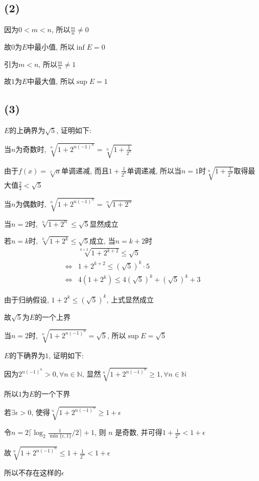 \documentclass[a4paper,11pt]{article}
\begin{document}
\subsection*{(2)}
因为$0<m<n$, 所以$\frac{m}{n} \not = 0$

故$0$为$E$中最小值, 所以$\inf E = 0$

引为$m<n$, 所以$\frac{m}{n} \not = 1$

故$1$为$E$中最大值, 所以$\sup E = 1$
\subsection*{(3)}
$E$的上确界为$\sqrt 5$, 证明如下:

当$n$为奇数时, $\sqrt[n]{1+2^{n(-1)^n}} = \sqrt[n]{1+\frac{1}{2^n}}$

由于$f(x)=\sqrt[x]{a}$单调递减, 而且$1+\frac{1}{2^n}$单调递减, 所以当$n=1$时$\sqrt[n]{1+\frac{1}{2^n}}$取得最大值$\frac{2}{3} < \sqrt{5}$

当$n$为偶数时, $\sqrt[n]{1+2^{n(-1)^n}} = \sqrt[n]{1+2^n}$

当$n=2$时, $\sqrt[n]{1+2^n} \le \sqrt{5}$显然成立

若$n=k$时, $\sqrt[k]{1+2^k} \le \sqrt{5}$成立, 当$n=k+2$时
\begin{align*}
	&\sqrt[k+2]{1+2^{k+2}} \le \sqrt{5}\\
	\Leftrightarrow&1+2^{k+2} \le (\sqrt{5})^k\cdot 5\\
	\Leftrightarrow&4(1+2^k) \le 4(\sqrt{5})^k + (\sqrt{5})^k + 3
\end{align*}

由于归纳假设, $1+2^k\le(\sqrt{5})^k$, 上式显然成立

故$\sqrt{5}$为$E$的一个上界

当$n=2$时, $\sqrt[n]{1+2^{n(-1)^n}} = \sqrt{5}$, 所以$\sup E=\sqrt{5}$

$E$的下确界为$1$, 证明如下:

因为$2^{n(-1)^n}>0, \forall n \in \mathbb{N}$, 显然$\sqrt[n]{1+2^{n(-1)^n}} \ge 1, \forall n \in \mathbb{N}$

所以$1$为$E$的一个下界

若$\exists \epsilon > 0$, 使得$\sqrt[n]{1+2^{n(-1)^n}} \ge 1 + \epsilon$

令$n = 2\lceil \log_2{\frac{1}{\min\{\epsilon,1\}}}/2 \rceil + 1$, 则 $n$ 是奇数, 并可得$1 + \frac{1}{2^n}<1 + \epsilon$

故$\sqrt[n]{1+2^{n(-1)^n}} \le 1 + \frac{1}{2^n} < 1 + \epsilon$

所以不存在这样的$\epsilon$
\end{document}
